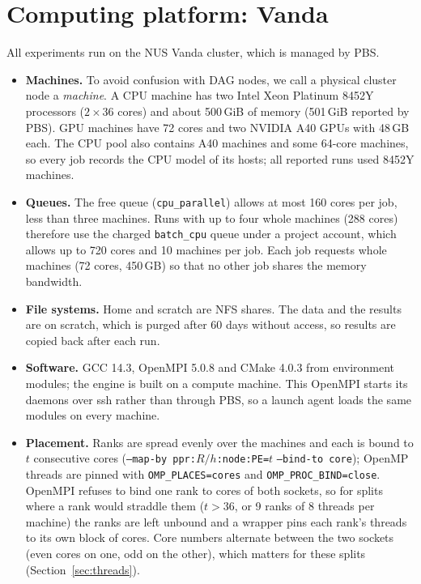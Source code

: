 \documentclass[11pt,a4paper]{article}
\newcommand{\code}[1]{\texttt{#1}}
\begin{document}
\section{Computing platform: Vanda}
\label{sec:platform}
All experiments run on the NUS Vanda cluster, which is managed by PBS.
\begin{itemize}[nosep]
  \item \textbf{Machines.} To avoid confusion with DAG nodes, we call a physical cluster node a \emph{machine}. A CPU machine has two Intel Xeon Platinum 8452Y processors ($2\times36$ cores) and about 500\,GiB of memory (501\,GiB reported by PBS). GPU machines have 72 cores and two NVIDIA A40 GPUs with 48\,GB each. The CPU pool also contains A40 machines and some 64-core machines, so every job records the CPU model of its hosts; all reported runs used 8452Y machines.
  \item \textbf{Queues.} The free queue (\code{cpu\_parallel}) allows at most 160 cores per job, less than three machines. Runs with up to four whole machines (288 cores) therefore use the charged \code{batch\_cpu} queue under a project account, which allows up to 720 cores and 10 machines per job. Each job requests whole machines (72 cores, 450\,GB) so that no other job shares the memory bandwidth.
  \item \textbf{File systems.} Home and scratch are NFS shares. The data and the results are on scratch, which is purged after 60 days without access, so results are copied back after each run.
  \item \textbf{Software.} GCC 14.3, OpenMPI 5.0.8 and CMake 4.0.3 from environment modules; the engine is built on a compute machine. This OpenMPI starts its daemons over ssh rather than through PBS, so a launch agent loads the same modules on every machine.
  \item \textbf{Placement.} Ranks are spread evenly over the machines and each is bound to $t$ consecutive cores (\code{--map-by ppr:$R/h$:node:PE=$t$} \code{--bind-to core}); OpenMP threads are pinned with \code{OMP\_PLACES=cores} and \code{OMP\_PROC\_BIND=close}. OpenMPI refuses to bind one rank to cores of both sockets, so for splits where a rank would straddle them ($t>36$, or 9 ranks of 8 threads per machine) the ranks are left unbound and a wrapper pins each rank's threads to its own block of cores. Core numbers alternate between the two sockets (even cores on one, odd on the other), which matters for these splits (Section~\ref{sec:threads}).
\end{itemize}
\end{document}
